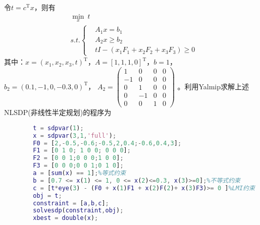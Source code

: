         \par
        令$t=c^\mathrm{T}x$，则有
        \begin{align*}
        & \min_x \ t\\
        & s.t.
        \left\{
        \begin{aligned}
        & A_1x = b_1\\
        & A_2x \geqslant b_2\\
        & tI - (x_1F_1+x_2F_2+x_3F_3) \geqslant 0
        \end{aligned}
        \right.
        \end{align*}
        其中：$x = (x_1,x_2,x_3,t)^\mathrm{T}$，$A=[1,1,1,0]^\mathrm{T}$，$b=1$，$b_2 = (0.1,-1,0,-0.3,0)^\mathrm{T}$，
        \begin{math}
        A_2=
        \left(
        \begin{smallmatrix}
        1& 0 & 0 & 0\\
        -1& 0 & 0 & 0\\
        0& 1 & 0 & 0\\
        0 &-1 & 0 & 0\\
        0& 0 & 1 &0
        \end{smallmatrix}
        \right)
        \end{math}
        。利用Yalmip求解上述NLSDP(非线性半定规划)的程序为
        \begin{lstlisting}[language = Matlab]
        %% 半定规划
        t = sdpvar(1);
        x = sdpvar(3,1,'full');
        F0 = [2,-0.5,-0.6;-0.5,2,0.4;-0.6,0.4,3];
        F1 = [0 1 0; 1 0 0; 0 0 0];
        F2 = [0 0 1;0 0 0;1 0 0];
        F3 = [0 0 0;0 0 1;0 1 0];
        a = [sum(x) == 1];%等式约束
        b = [0.7 <= x(1) <= 1, 0 <= x(2)<=0.3, x(3)>=0];%不等式约束
        c = [t*eye(3) - (F0 + x(1)F1 + x(2)F(2)+ x(3)F3)>= 0 ]%LMI约束
        obj = t;
        constraint = [a,b,c];
        solvesdp(constraint,obj);
        xbest = double(x);
        \end{lstlisting}

